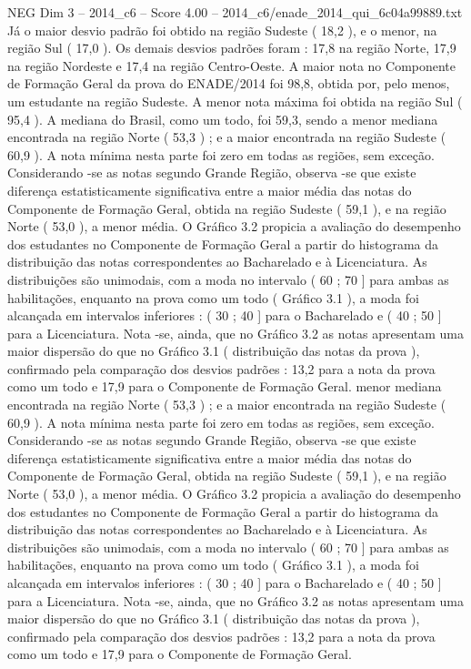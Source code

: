\begin{textsample}{NEG Dim 3 – 2014\_c6 – Score 4.00 – 2014\_c6/enade\_2014\_qui\_6c04a99889.txt}
Já o maior desvio padrão foi obtido na região Sudeste ( 18,2 ), e o menor, na região Sul ( 17,0 ).
Os demais desvios padrões foram : 17,8 na região Norte, 17,9 na região Nordeste e 17,4 na região Centro-Oeste.
A maior nota no Componente de Formação Geral da prova do ENADE/2014 foi 98,8, obtida por, pelo menos, um estudante na região Sudeste.
A menor nota máxima foi obtida na região Sul ( 95,4 ).
A mediana do Brasil, como um todo, foi 59,3, sendo a menor mediana encontrada na região Norte ( 53,3 ) ; e a maior encontrada na região Sudeste ( 60,9 ).
A nota mínima nesta parte foi zero em todas as regiões, sem exceção.
Considerando -se as notas segundo Grande Região, observa -se que existe diferença estatisticamente significativa entre a maior média das notas do Componente de Formação Geral, obtida na região Sudeste ( 59,1 ), e na região Norte ( 53,0 ), a menor média.
O Gráfico 3.2 propicia a avaliação do desempenho dos estudantes no Componente de Formação Geral a partir do histograma da distribuição das notas correspondentes ao Bacharelado e à Licenciatura.
As distribuições são unimodais, com a moda no intervalo ( 60 ; 70 ] para ambas as habilitações, enquanto na prova como um todo ( Gráfico 3.1 ), a moda foi alcançada em intervalos inferiores : ( 30 ; 40 ] para o Bacharelado e ( 40 ; 50 ] para a Licenciatura.
Nota -se, ainda, que no Gráfico 3.2 as notas apresentam uma maior dispersão do que no Gráfico 3.1 ( distribuição das notas da prova ), confirmado pela comparação dos desvios padrões : 13,2 para a nota da prova como um todo e 17,9 para o Componente de Formação Geral. menor mediana encontrada na região Norte ( 53,3 ) ; e a maior encontrada na região Sudeste ( 60,9 ).
A nota mínima nesta parte foi zero em todas as regiões, sem exceção.
Considerando -se as notas segundo Grande Região, observa -se que existe diferença estatisticamente significativa entre a maior média das notas do Componente de Formação Geral, obtida na região Sudeste ( 59,1 ), e na região Norte ( 53,0 ), a menor média.
O Gráfico 3.2 propicia a avaliação do desempenho dos estudantes no Componente de Formação Geral a partir do histograma da distribuição das notas correspondentes ao Bacharelado e à Licenciatura.
As distribuições são unimodais, com a moda no intervalo ( 60 ; 70 ] para ambas as habilitações, enquanto na prova como um todo ( Gráfico 3.1 ), a moda foi alcançada em intervalos inferiores : ( 30 ; 40 ] para o Bacharelado e ( 40 ; 50 ] para a Licenciatura.
Nota -se, ainda, que no Gráfico 3.2 as notas apresentam uma maior dispersão do que no Gráfico 3.1 ( distribuição das notas da prova ), confirmado pela comparação dos desvios padrões : 13,2 para a nota da prova como um todo e 17,9 para o Componente de Formação Geral.

\end{textsample}
